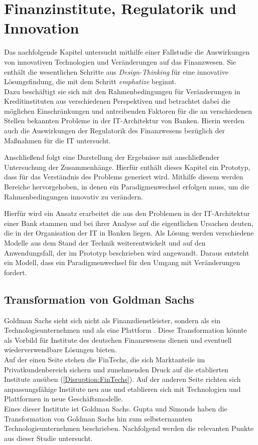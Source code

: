\chapter{Finanzinstitute, Regulatorik und Innovation}
\label{ch:background}
Das nachfolgende Kapitel untersucht mithilfe einer Fallstudie die Auswirkungen von innovativen Technologien und Veränderungen auf das Finanzwesen. Sie enthält die wesentlichen Schritte aus \emph{Design-Thinking} für eine innovative Lösungsfindung, die mit dem Schritt \emph{emphatize} beginnt.
\medskip
\\
Dazu beschäftigt sie sich mit den Rahmenbedingungen für Veränderungen in Kreditinstituten aus verschiedenen Perspektiven und betrachtet dabei die möglichen Einschränkungen und antreibenden Faktoren für die an verschiedenen Stellen bekannten Probleme in der IT-Architektur von Banken. Hierin werden auch die Auswirkungen der Regulatorik des Finanzwesens bezüglich der Maßnahmen für die IT untersucht.

Anschließend folgt eine Darstellung der Ergebnisse mit anschließender Untersuchung der Zusammenhänge. Hierfür enthält dieses Kapitel ein Prototyp, dass für das Verständnis des Problems generiert wird. 
Mithilfe diesem werden Bereiche hervorgehoben, in denen ein Paradigmenwechsel erfolgen muss, um die Rahmenbedingungen innovativ zu verändern. 

Hierfür wird ein Ansatz erarbeitet die aus den Problemen in der IT-Architektur einer Bank stammen und bei ihrer Analyse auf die eigentlichen Ursachen deuten, die in der Organisation der IT in Banken liegen. Als Lösung werden verschiedene Modelle aus dem Stand der Technik weiterentwickelt und auf den Anwendungsfall, der im Prototyp beschrieben wird angewandt. Daraus entsteht ein Modell, dass ein Paradigmenwechsel für den Umgang mit Veränderungen fordert.

\section{Transformation von Goldman Sachs}
\label{section:Goldman}
Goldman Sachs sieht sich nicht als Finanzdienstleister, sondern als ein Technologieunternehmen und als eine Plattform \cite{Gupta:2017}. Diese Transformation könnte als Vorbild für Institute des deutschen Finanzwesens dienen und eventuell wiederverwendbare Lösungen bieten.
\medskip
\\
Auf der einen Seite stehen die FinTechs, die sich Marktanteile im Privatkundenbereich sichern und zunehmenden Druck auf die etablierten Institute ausüben (\ref{Disruption:FinTechs}). Auf der anderen Seite richten sich anpassungsfähige Institute neu aus und etablieren sich mit Technologien und Plattformen in neue Geschäftsmodelle. 
\medskip
\\
Eines dieser Institute ist Goldman Sachs.
Gupta und Simonds \cite{Gupta:2017} haben die Transformation von Goldman Sachs hin zum selbsternannten Technologieunternehmen \cite{Gupta:2017} beschrieben. Nachfolgend werden die relevanten Punkte aus dieser Studie untersucht.
%
